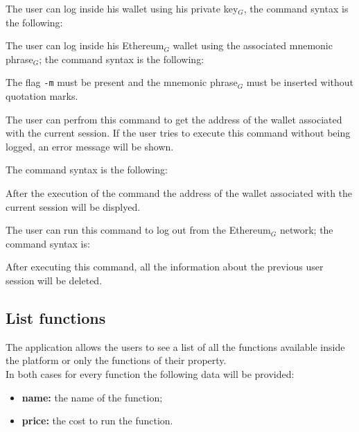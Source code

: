 The user can log inside his wallet using his private key$_{G}$, the command syntax is the following: \\
\begin{center}
\end{center}

The user can log inside his Ethereum$_{G}$ wallet using the associated mnemonic phrase$_{G}$; the command syntax is the following:

\begin{center}
\end{center}
The flag \texttt{-m} must be present and the mnemonic phrase$_{G}$ must be inserted without quotation marks.

The user can perfrom this command to get the address of the wallet associated with the current session. If the user tries to execute this command without being logged, an error message will be shown.

The command syntax is the following: \\
\begin{center}
\end{center}
After the execution of the command the address of the wallet associated with the current session will be displyed.

The user can run this command to log out from the Ethereum$_{G}$ network; the command syntax is:
\begin{center}
\end{center}
After executing this command, all the information about the previous user session will be deleted.

\subsection{List functions}
The application allows the users to see a list of all the functions available inside the platform or only the functions of their property. \\
\noindent In both cases for every function the following data will be provided:
\begin{itemize}
	\item \textbf{name: } the name of the function;
	\item \textbf{price: } the cost to run the function.
\end{itemize}

